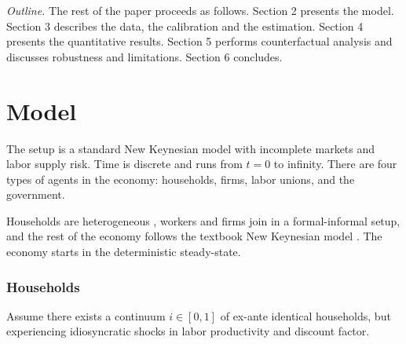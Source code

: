 \documentclass[12pt]{article}
\begin{document}


\textit{Outline.} The rest of the paper proceeds as follows. Section 2 presents the
model. Section 3 describes the data, the calibration and the estimation. Section 4
presents the quantitative results. Section 5 performs counterfactual analysis and
discusses robustness and limitations. Section 6 concludes.


\section{Model}

The setup is a standard New Keynesian model with incomplete markets and labor supply
risk. Time is discrete and runs from $t=0$ to infinity. There are four types of agents
in the economy: households, firms, labor unions, and the government.

Households are heterogeneous \parencite{aiyagari1994uninsured}, workers and firms join
in a formal-informal setup, and the rest of the economy follows the textbook New
Keynesian model \parencite{gali2015monetary}. The economy starts in the deterministic
steady-state.

\subsubsection*{Households}
Assume there exists a continuum $i\in[0,1]$ of ex-ante identical households, but
experiencing idiosyncratic shocks in labor productivity and discount factor.
\end{document}
